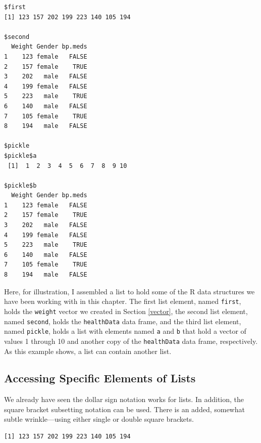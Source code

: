 \documentclass[
]{krantz}
\makeatletter
\newenvironment{Shaded}{\begin{snugshade}}{\end{snugshade}}
\newcommand{\KeywordTok}[1]{\textcolor[rgb]{0.27,0.27,0.27}{\textbf{#1}}}
\newcommand{\NormalTok}[1]{#1}
\newcommand{\OperatorTok}[1]{\textcolor[rgb]{0.43,0.43,0.43}{\textbf{#1}}}
\newenvironment{kframe}{%
\medskip{}
\setlength{\fboxsep}{.8em}
 \def\at@end@of@kframe{}%
 \ifinner\ifhmode%
  \def\at@end@of@kframe{\end{minipage}}%
  \begin{minipage}{\columnwidth}%
 \fi\fi%
 \def\FrameCommand##1{\hskip\@totalleftmargin \hskip-\fboxsep
 \colorbox{shadecolor}{##1}\hskip-\fboxsep
     \hskip-\linewidth \hskip-\@totalleftmargin \hskip\columnwidth}%
 \MakeFramed {\advance\hsize-\width
   \@totalleftmargin\z@ \linewidth\hsize
   \@setminipage}}%
 {\par\unskip\endMakeFramed%
 \at@end@of@kframe}
\renewenvironment{Shaded}{\begin{kframe}}{\end{kframe}}
\makeatother
\begin{document}
\begin{verbatim}
$first
[1] 123 157 202 199 223 140 105 194

$second
  Weight Gender bp.meds
1    123 female   FALSE
2    157 female    TRUE
3    202   male   FALSE
4    199 female   FALSE
5    223   male    TRUE
6    140   male   FALSE
7    105 female    TRUE
8    194   male   FALSE

$pickle
$pickle$a
 [1]  1  2  3  4  5  6  7  8  9 10

$pickle$b
  Weight Gender bp.meds
1    123 female   FALSE
2    157 female    TRUE
3    202   male   FALSE
4    199 female   FALSE
5    223   male    TRUE
6    140   male   FALSE
7    105 female    TRUE
8    194   male   FALSE
\end{verbatim}

Here, for illustration, I assembled a list to hold some of the R data structures we have been working with in this chapter. The first list element, named \texttt{first}, holds the \texttt{weight} vector we created in Section \ref{vector}, the second list element, named \texttt{second}, holds the \texttt{healthData} data frame, and the third list element, named \texttt{pickle}, holds a list with elements named \texttt{a} and \texttt{b} that hold a vector of values 1 through 10 and another copy of the \texttt{healthData} data frame, respectively. As this example shows, a list can contain another list.

\hypertarget{accessing-specific-elements-of-lists}{%
\subsection{Accessing Specific Elements of Lists}\label{accessing-specific-elements-of-lists}}

We already have seen the dollar sign notation works for lists. In addition, the square bracket subsetting notation can be used. There is an added, somewhat subtle wrinkle---using either single or double square brackets.

\begin{Shaded}
\end{Shaded}

\begin{verbatim}
[1] 123 157 202 199 223 140 105 194
\end{verbatim}

\begin{Shaded}
\end{Shaded}
\end{document}
